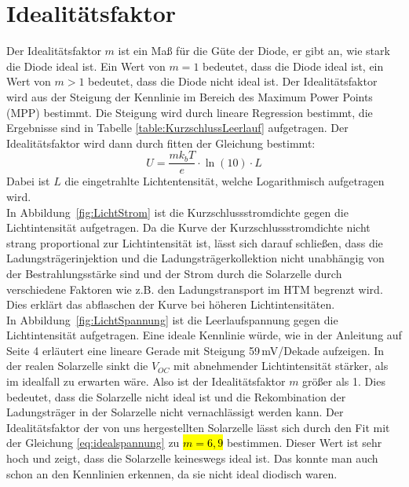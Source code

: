 \documentclass[12pt,a4paper,ngerman]{report}
\begin{document}
\section{Idealitätsfaktor}
Der Idealitätsfaktor $m$ ist ein Maß für die Güte der Diode, er gibt an, wie stark die Diode ideal ist. Ein Wert von $m=1$ bedeutet, dass die Diode ideal ist, ein Wert von $m>1$ bedeutet, dass die Diode nicht ideal ist. Der Idealitätsfaktor wird aus der Steigung der Kennlinie im Bereich des Maximum Power Points (MPP) bestimmt. Die Steigung wird durch lineare Regression bestimmt, die Ergebnisse sind in Tabelle \ref{table:KurzschlussLeerlauf} aufgetragen. Der Idealitätsfaktor wird dann durch fitten der Gleichung bestimmt: 
\begin{equation}\label{eq:idealspannung} U = \frac{m k_b T}{e} \cdot \ln(10) \cdot L \end{equation}
Dabei ist $L$ die eingetrahlte Lichtentensität, welche Logarithmisch aufgetragen wird.\\
In Abbildung~\ref{fig:LichtStrom} ist die Kurzschlussstromdichte gegen die Lichtintensität aufgetragen. Da die Kurve der Kurzschlussstromdichte nicht strang proportional zur Lichtintensität ist, lässt sich darauf schließen, dass die Ladungsträgerinjektion und die Ladungsträgerkollektion nicht unabhängig von der Bestrahlungsstärke sind und der Strom durch die Solarzelle durch verschiedene Faktoren wie z.B. den Ladungstransport im HTM begrenzt wird. Dies erklärt das abflaschen der Kurve bei höheren Lichtintensitäten.\\
In Abbildung~\ref{fig:LichtSpannung} ist die Leerlaufspannung gegen die Lichtintensität aufgetragen. Eine ideale Kennlinie würde, wie in der Anleitung \cite{Anleitung} auf Seite 4 erläutert eine lineare Gerade mit Steigung 59\,mV/Dekade aufzeigen. In der realen Solarzelle sinkt die $V_{OC}$ mit abnehmender Lichtintensität stärker, als im idealfall zu erwarten wäre. Also ist der Idealitätsfaktor $m$ größer als 1. Dies bedeutet, dass die Solarzelle nicht ideal ist und die Rekombination der Ladungsträger in der Solarzelle nicht vernachlässigt werden kann. Der Idealitätsfaktor der von uns hergestellten Solarzelle lässt sich durch den Fit mit der Gleichung \ref{eq:idealspannung} zu \hl{$m=6,9$} bestimmen. Dieser Wert ist sehr hoch und zeigt, dass die Solarzelle keineswegs ideal ist. Das konnte man auch schon an den Kennlinien erkennen, da sie nicht ideal diodisch waren.\\
\end{document}
